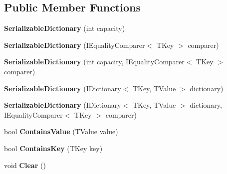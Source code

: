 \subsection*{Public Member Functions}
\begin{DoxyCompactItemize}
\item 
{\bfseries Serializable\+Dictionary} (int capacity)\hypertarget{class_serializable_dictionary_a3f15a6c46857f985aa05c36b5a3184c0}{}\label{class_serializable_dictionary_a3f15a6c46857f985aa05c36b5a3184c0}

\item 
{\bfseries Serializable\+Dictionary} (I\+Equality\+Comparer$<$ T\+Key $>$ comparer)\hypertarget{class_serializable_dictionary_a26857cfa4b58191117fc3d198a526559}{}\label{class_serializable_dictionary_a26857cfa4b58191117fc3d198a526559}

\item 
{\bfseries Serializable\+Dictionary} (int capacity, I\+Equality\+Comparer$<$ T\+Key $>$ comparer)\hypertarget{class_serializable_dictionary_a629eafd762dc25f3d27bc2a248449681}{}\label{class_serializable_dictionary_a629eafd762dc25f3d27bc2a248449681}

\item 
{\bfseries Serializable\+Dictionary} (I\+Dictionary$<$ T\+Key, T\+Value $>$ dictionary)\hypertarget{class_serializable_dictionary_aca3171114460ae74e72591cb4811930b}{}\label{class_serializable_dictionary_aca3171114460ae74e72591cb4811930b}

\item 
{\bfseries Serializable\+Dictionary} (I\+Dictionary$<$ T\+Key, T\+Value $>$ dictionary, I\+Equality\+Comparer$<$ T\+Key $>$ comparer)\hypertarget{class_serializable_dictionary_ae12affb27480578e15e44da98e8511d0}{}\label{class_serializable_dictionary_ae12affb27480578e15e44da98e8511d0}

\item 
bool {\bfseries Contains\+Value} (T\+Value value)\hypertarget{class_serializable_dictionary_a933aa36baea21aaaa5dd2057114b5882}{}\label{class_serializable_dictionary_a933aa36baea21aaaa5dd2057114b5882}

\item 
bool {\bfseries Contains\+Key} (T\+Key key)\hypertarget{class_serializable_dictionary_a09450f3c7706310523f8521de352c763}{}\label{class_serializable_dictionary_a09450f3c7706310523f8521de352c763}

\item 
void {\bfseries Clear} ()\hypertarget{class_serializable_dictionary_a3c803fb1a4687e1017bcb46c7b601418}{}\label{class_serializable_dictionary_a3c803fb1a4687e1017bcb46c7b601418}


\end{DoxyCompactItemize}
